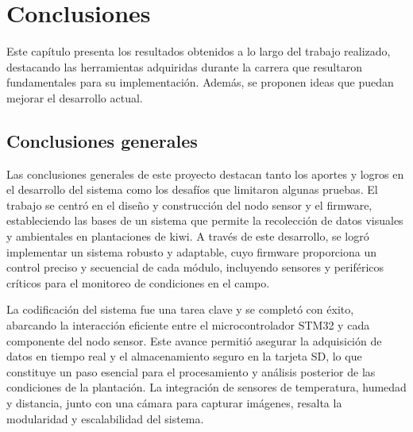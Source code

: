 
\chapter{Conclusiones} %

\label{Chapter5} %

Este capítulo presenta los resultados obtenidos a lo largo del trabajo realizado, destacando las herramientas adquiridas durante la carrera que resultaron fundamentales para su implementación. Además, se proponen ideas que puedan mejorar el desarrollo actual.



\section{Conclusiones generales }

Las conclusiones generales de este proyecto destacan tanto los aportes y logros en el desarrollo del sistema como los desafíos que limitaron algunas pruebas. El trabajo se centró en el diseño y construcción del nodo sensor y el firmware, estableciendo las bases de un sistema que permite la recolección de datos visuales y ambientales en plantaciones de kiwi. A través de este desarrollo, se logró implementar un sistema robusto y adaptable, cuyo firmware proporciona un control preciso y secuencial de cada módulo, incluyendo sensores y periféricos críticos para el monitoreo de condiciones en el campo.

La codificación del sistema fue una tarea clave y se completó con éxito, abarcando la interacción eficiente entre el microcontrolador STM32 y cada componente del nodo sensor. Este avance permitió asegurar la adquisición de datos en tiempo real y el almacenamiento seguro en la tarjeta SD, lo que constituye un paso esencial para el procesamiento y análisis posterior de las condiciones de la plantación. La integración de sensores de temperatura, humedad y distancia, junto con una cámara para capturar imágenes, resalta la modularidad y escalabilidad del sistema. 


